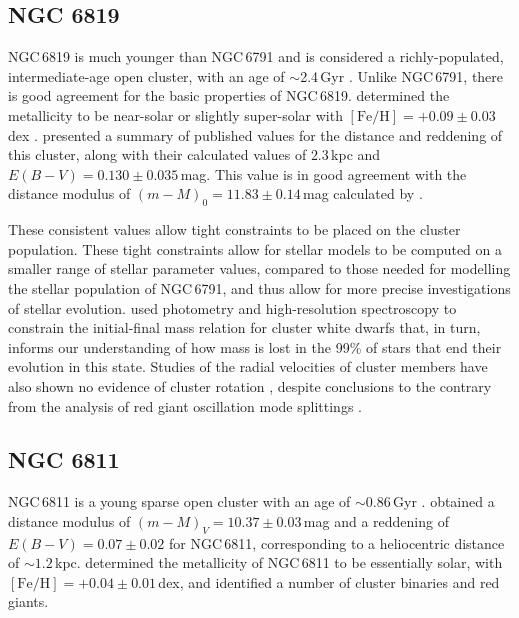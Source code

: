 \subsection{NGC 6819}

NGC\,6819 is much younger than NGC\,6791 and is considered a richly-populated, intermediate-age open cluster, with an age of $\sim$2.4\,Gyr \cite[eg.][and references therein]{handberg_ngc_2017, bedin_hubble_2015, basu_sounding_2011}. Unlike NGC\,6791, there is good agreement for the basic properties of NGC\,6819. \cite{bragaglia_metal_2001} determined the metallicity to be near-solar or slightly super-solar with $[\mathrm{Fe/H}] = +0.09 \pm 0.03$\,dex \cite[see also;][]{slumstrup_[y/mg]_2017}. \cite{ak_ccd_2016} presented a summary of published values for the distance and reddening of this cluster, along with their calculated values of $2.3$\,kpc and $E(B-V) = 0.130 \pm 0.035$\,mag. This value is in good agreement with the distance modulus of $(m-M)_0 = 11.83 \pm 0.14$\,mag calculated by \cite{wu_new_2014}.

These consistent values allow tight constraints to be placed on the cluster population. These tight constraints allow for stellar models to be computed on a smaller range of stellar parameter values, compared to those needed for modelling the stellar population of NGC\,6791, and thus allow for more precise investigations of stellar evolution. \cite{kalirai_initial-final_2008} used photometry and high-resolution spectroscopy to constrain the initial-final mass relation for cluster white dwarfs that, in turn, informs our understanding of how mass is lost in the 99\% of stars that end their evolution in this state. Studies of the radial velocities of cluster members have also shown no evidence of cluster rotation \citep{kamann_linking_2018}, despite conclusions to the contrary from the analysis of red giant oscillation mode splittings \citep{corsaro_spin_2017}.

\subsection{NGC 6811}

NGC\,6811 is a young sparse open cluster with an age of $\sim 0.86$\,Gyr \citep{janes_ngc_2013}. \cite{sandquist_age_2016-1} obtained a distance modulus of $(m-M)_V = 10.37 \pm 0.03$\,mag and a reddening of $E(B-V) = 0.07 \pm 0.02$ for NGC\,6811, corresponding to a heliocentric distance of $\sim 1.2$\,kpc. \cite{molenda-zakowicz_spectroscopic_2014} determined the metallicity of NGC\,6811 to be essentially solar, with $[\mathrm{Fe/H}] = +0.04 \pm 0.01$\,dex, and identified a number of cluster binaries and red giants.

